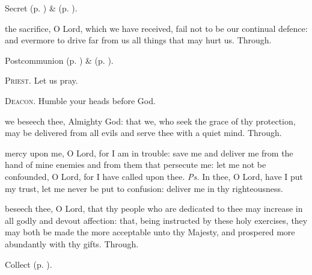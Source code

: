 \begin{rubric}
     Secret  (p. \pageref{SevenSorrowsSecret}) \&   (p. \pageref{AshWednesdayMassSecret}).
\end{rubric}


\vspace{-0.2\baselineskip}

\postcommunion

\vspace{-0.1\baselineskip}

 the sacrifice, O Lord, which we have received, fail not to be our continual defence: and evermore to drive far from us all things that may hurt us. Through.

\begin{rubric}
     Postcommunion  (p. \pageref{SevenSorrowsPostcommunion}) \&   (p. \pageref{AshWednesdayMassPostcommunion}).
\end{rubric}


\clearpage
\textsc{Priest.} Let us pray.\par
\textsc{Deacon.} Humble your heads before God.\par
{} we beseech thee, Almighty God: that we, who seek the grace of thy protection, may be delivered from all evils and serve thee with a quiet mind. Through.

\introit
{} mercy upon me, O Lord, for I am in trouble: save me and deliver me from the hand of mine enemies and from them that persecute me: let me not be confounded, O Lord, for I have called upon thee. \textit{Ps.} In thee, O Lord, have I put my trust, let me never be put to confusion: deliver me in thy righteousness.


\vspace{-0.4\baselineskip}

\collect

\vspace{-0.1\baselineskip}

 beseech thee, O Lord, that thy people who are dedicated to thee may increase in all godly and devout affection: that, being instructed by these holy exercises, they may both be made the more acceptable unto thy Majesty, and prospered more abundantly with thy gifts. Through.
\begin{rubric}
     Collect  (p. \pageref{AshWednesdayMassCollect}).
\end{rubric}

